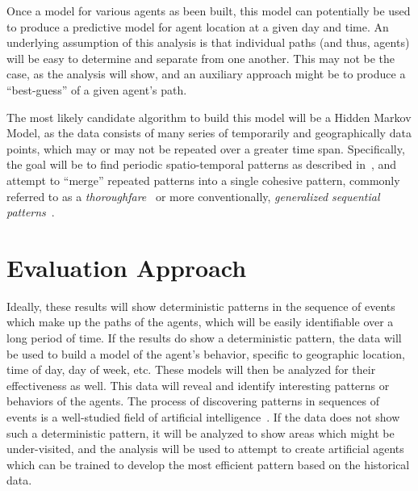 \documentclass[conference]{IEEEtran}
\begin{document}
Once a model for various agents as been built, this model can potentially be
used to produce a predictive model for agent location at a given day and time.
An underlying assumption of this analysis is that individual paths (and thus,
agents) will be easy to determine and separate from one another. This may not be
the case, as the analysis will show, and an auxiliary approach might be to
produce a ``best-guess'' of a given agent's path.

The most likely candidate algorithm to build this model will be a Hidden Markov
Model, as the data consists of many series of temporarily and geographically data
points, which may or may not be repeated over a greater time span. Specifically,
the goal will be to find periodic spatio-temporal patterns as described
in~\cite{laube2007movement}, and attempt to ``merge'' repeated patterns into a
single cohesive pattern, commonly referred to as a
\emph{thoroughfare}~\cite{Verhein06miningspatio-temporal} or more
conventionally, \emph{generalized sequential patterns}~\cite{Orellana2012672}.

\section{Evaluation Approach}
\label{sec:results}
Ideally, these results will show deterministic patterns in the sequence of
events which make up the paths of the agents, which will be easily identifiable
over a long period of time.  If the results do show a deterministic pattern, the
data will be used to build a model of the agent's behavior, specific to
geographic location, time of day, day of week, etc. These models will then be
analyzed for their effectiveness as well. This data will reveal and identify
interesting patterns or behaviors of the agents. The process of discovering
patterns in sequences of events is a well-studied field of artificial
intelligence~\cite{Dietterich85discoveringpatterns}. If the data does not show
such a deterministic pattern, it will be analyzed to show areas which might be
under-visited, and the analysis will be used to attempt to create artificial
agents which can be trained to develop the most efficient pattern based on the
historical data.
\end{document}

